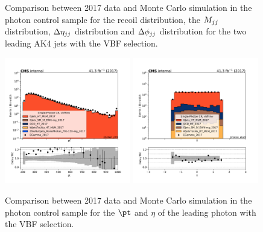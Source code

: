 \begin{figure}[htbp]
\begin{center}
    \end{center}
    \caption{Comparison between 2017 data and Monte Carlo simulation in the photon control sample for
        the recoil distribution, the $M_{jj}$ distribution, $\Delta \eta_{jj}$ distribution and $\Delta \phi_{jj}$ distribution
        for the two leading AK4 jets with the VBF selection.}
    \label{fig:Photon_vbfhinv_2017}
\end{figure}

\begin{figure}[htbp]
    \begin{center}
        \includegraphics[width=0.49\textwidth]{fig/datamc/cr_g_vbf/cr_g_vbf_photon_pt0_losf_2017.pdf}
        \includegraphics[width=0.49\textwidth]{fig/datamc/cr_g_vbf/cr_g_vbf_photon_eta0_losf_2017.pdf}
    \end{center}
    \caption{Comparison between 2017 data and Monte Carlo simulation in the photon control sample for
        the $\pt$ and $\eta$ of the leading photon with the VBF selection.}
    \label{fig:Photon2_vbfhinv_2017}
\end{figure}


